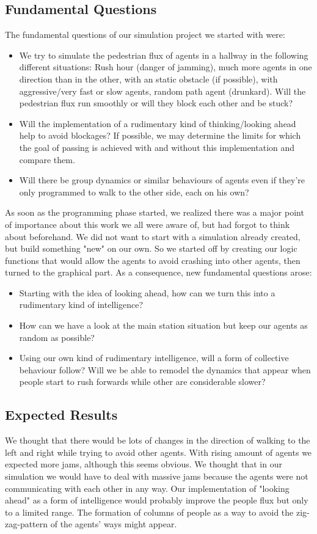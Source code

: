 \pagebreak

\subsection{Fundamental Questions}
The fundamental questions of our simulation project we started with were:
\begin{itemize}
\item We try to simulate the pedestrian flux of agents in a hallway in the following different situations: Rush hour (danger of jamming), much more agents in one direction than in the other, with an static obstacle (if possible), with aggressive/very fast or slow agents, random path agent (drunkard). Will the pedestrian flux run smoothly or will they block each other and be stuck?
\item Will the implementation of a rudimentary kind of thinking/looking ahead help to avoid blockages? If possible, we may determine the limits for which the goal of passing is achieved with and without this implementation and compare them.
\item Will there be group dynamics or similar behaviours of agents even if they're only programmed to walk to the other side, each on his own?
\end{itemize}

\noi As soon as the programming phase started, we realized there was a major point of importance about this work we all were aware of, but had forgot to think about beforehand. We did not want to start with a simulation already created, but build something "new" on our own. So we started off by creating our logic functions that would allow the agents to avoid crashing into other agents, then turned to the graphical part. As a consequence, new fundamental questions arose:
\begin{itemize}
\item Starting with the idea of looking ahead, how can we turn this into a rudimentary kind of intelligence?
\item How can we have a look at the main station situation but keep our agents as random as possible?
\item Using our own kind of rudimentary intelligence, will a form of collective behaviour follow? Will we be able to remodel the dynamics that appear when people start to rush forwards while other are considerable slower?
\end{itemize}

\subsection{Expected Results}
We thought that there would be lots of changes in the direction of walking to the left and right while trying to avoid other agents. With rising amount of agents we expected more jams, although this seems obvious. We thought that in our simulation we would have to deal with massive jams because the agents were not communicating with each other in any way. Our implementation of "looking ahead" as a form of intelligence would probably improve the people flux but only to a limited range. The formation of columns of people as a way to avoid the zig-zag-pattern of the agents' ways might appear.
